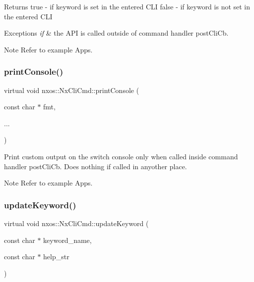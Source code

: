 \begin{DoxyReturn}{Returns}
true -\/ if keyword is set in the entered C\+LI false -\/ if keyword is not set in the entered C\+LI
\end{DoxyReturn}

\begin{DoxyExceptions}{Exceptions}
{\em if} & the A\+PI is called outside of command handler post\+Cli\+Cb. \\
\hline
\end{DoxyExceptions}
\begin{DoxyNote}{Note}
Refer to example Apps. 
\end{DoxyNote}
\mbox{\label{classnxos_1_1_nx_cli_cmd_a10c723c79d75ac2c85821b5ca6540c62}} 
\subsubsection{\texorpdfstring{print\+Console()}{printConsole()}}
{\footnotesize\ttfamily virtual void nxos\+::\+Nx\+Cli\+Cmd\+::print\+Console (\begin{DoxyParamCaption}\item[{const char $\ast$}]{fmt,  }\item[{}]{... }\end{DoxyParamCaption})\hspace{0.3cm}{\ttfamily [pure virtual]}}

Print custom output on the switch console only when called inside command handler post\+Cli\+Cb. Does nothing if called in anyother place.

\begin{DoxyNote}{Note}
Refer to example Apps. 
\end{DoxyNote}
\mbox{\label{classnxos_1_1_nx_cli_cmd_aa698fdd1026739307e0710e2948f19f5}} 
\subsubsection{\texorpdfstring{update\+Keyword()}{updateKeyword()}\hspace{0.1cm}{\footnotesize\ttfamily [1/2]}}
{\footnotesize\ttfamily virtual void nxos\+::\+Nx\+Cli\+Cmd\+::update\+Keyword (\begin{DoxyParamCaption}\item[{const char $\ast$}]{keyword\+\_\+name,  }\item[{const char $\ast$}]{help\+\_\+str }\end{DoxyParamCaption})\hspace{0.3cm}{\ttfamily [pure virtual]}}

